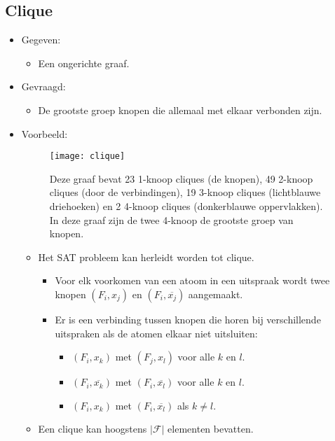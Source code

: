 \subsection{Clique}
\begin{itemize}
    \item Gegeven:
    \begin{itemize}
        \item Een ongerichte graaf.
    \end{itemize}
    \item Gevraagd:
    \begin{itemize}
        \item De grootste groep knopen die allemaal met elkaar verbonden zijn.
    \end{itemize}
    \item Voorbeeld:
    \begin{figure}[ht]
        \centering
        \texttt{[image: clique]}
        \caption{Deze graaf bevat 23 1-knoop cliques (de knopen), 49 2-knoop cliques (door de verbindingen), 19 3-knoop cliques (lichtblauwe driehoeken) en 2 4-knoop cliques (donkerblauwe oppervlakken). In deze graaf zijn de twee 4-knoop de grootste groep van knopen.}
        \label{clique}
    \end{figure}
    \begin{itemize}
        \item Het SAT probleem kan herleidt worden tot clique.
        \begin{itemize}
            \item Voor elk voorkomen van een atoom in een uitspraak wordt twee knopen $(F_i, x_j)$ en $(F_i, \overline{x_j})$ aangemaakt.
            \item Er is een verbinding tussen knopen die horen bij verschillende uitspraken als de atomen elkaar niet uitsluiten:
            \begin{itemize}
                \item $(F_i, x_k)$ met $(F_j, x_l)$ voor alle $k$ en $l$.
                \item $(F_i, \overline{x_k})$ met $(F_i, \overline{x_l})$ voor alle $k$ en $l$.
                \item $(F_i, x_k)$ met $(F_i, \overline{x_l})$ als $k \neq l$.
            \end{itemize}
        \end{itemize}
        \item Een clique kan hoogstens $|\mathcal{F}|$ elementen bevatten.
    \end{itemize}
\end{itemize}

